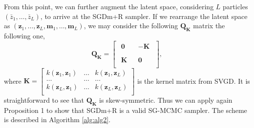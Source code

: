 From this point, we can further augment the latent space, considering $L$ particles $(\bar{z}_1, \ldots, \bar{z}_L)$, to arrive at the SGDm+R sampler. If we rearrange the latent space as $(\bm{z}_1, \ldots, \bm{z}_L, \bm{m}_1, \ldots, \bm{m}_L)$, we may consider the following $\mathbf{Q_K}$ matrix the following one,
$$
\mathbf{Q_K} = \left[
\begin{array}{c|c}
\begin{matrix}
\bm{0} \\
\end{matrix}  & \begin{matrix}
 -\textbf{K} \\
\end{matrix} \\
\hline
\begin{matrix}
\textbf{K}  \\
\end{matrix} & \begin{matrix}
 \bm{0} \\
\end{matrix}
\end{array}
\right],
$$
where $\textbf{K} = \begin{bmatrix}
k(\bm{z}_1, \bm{z}_1) & \ldots & k(\bm{z}_1, \bm{z}_L) \\
\ldots & \ldots & \ldots \\
k(\bm{z}_L, \bm{z}_1) & \ldots & k(\bm{z}_L, \bm{z}_L) \\
\end{bmatrix}$ is the kernel matrix from SVGD. It is straightforward to see that $\mathbf{Q_K}$ is skew-symmetric. Thus we can apply again Proposition 1 to show that SGDm+R is a valid SG-MCMC sampler. The scheme is described in Algorithm \ref{alg:alg2}.

